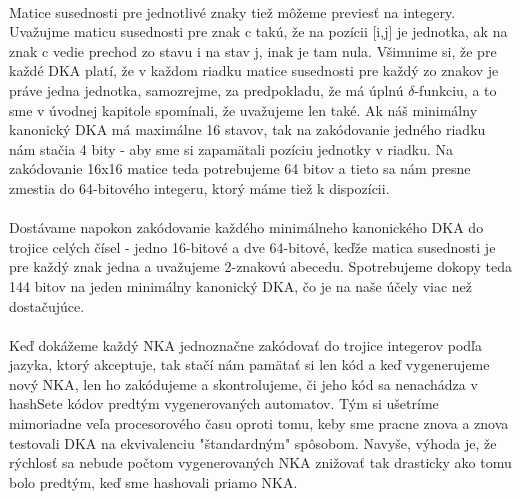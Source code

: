\paragraph{}
Matice susednosti pre jednotlivé znaky tiež môžeme previesť na integery. Uvažujme maticu susednosti pre znak c takú, že na pozícii [i,j] je jednotka, ak na znak c vedie prechod zo stavu i na stav j, inak je tam nula. Všimnime si, že pre každé DKA platí, že v každom riadku matice susednosti pre každý zo znakov je práve jedna jednotka, samozrejme, za predpokladu, že má úplnú $\delta$-funkciu, a to sme v úvodnej kapitole spomínali, že uvažujeme len také. Ak náš minimálny kanonický DKA má maximálne 16 stavov, tak na zakódovanie jedného riadku nám stačia 4 bity - aby sme si zapamätali pozíciu jednotky v riadku. Na zakódovanie 16x16 matice teda potrebujeme 64 bitov a tieto sa nám presne zmestia do 64-bitového integeru, ktorý máme tiež k dispozícii.
\paragraph{}
Dostávame napokon zakódovanie každého minimálneho kanonického DKA do trojice celých čísel - jedno 16-bitové a dve 64-bitové, keďže matica susednosti je pre každý znak jedna a uvažujeme 2-znakovú abecedu. Spotrebujeme dokopy teda 144 bitov na jeden minimálny kanonický DKA, čo je na naše účely viac než dostačujúce.
\paragraph{}
Keď dokážeme každý NKA jednoznačne zakódovať do trojice integerov podľa jazyka, ktorý akceptuje, tak stačí nám pamätať si len kód a keď vygenerujeme nový NKA, len ho zakódujeme a skontrolujeme, či jeho kód sa nenachádza v hashSete kódov predtým vygenerovaných automatov. Tým si ušetríme mimoriadne veľa procesorového času oproti tomu, keby sme pracne znova a znova testovali DKA na ekvivalenciu "štandardným" spôsobom. Navyše, výhoda je, že rýchlosť sa nebude počtom vygenerovaných NKA znižovať tak drasticky ako tomu bolo predtým, keď sme hashovali priamo NKA.








